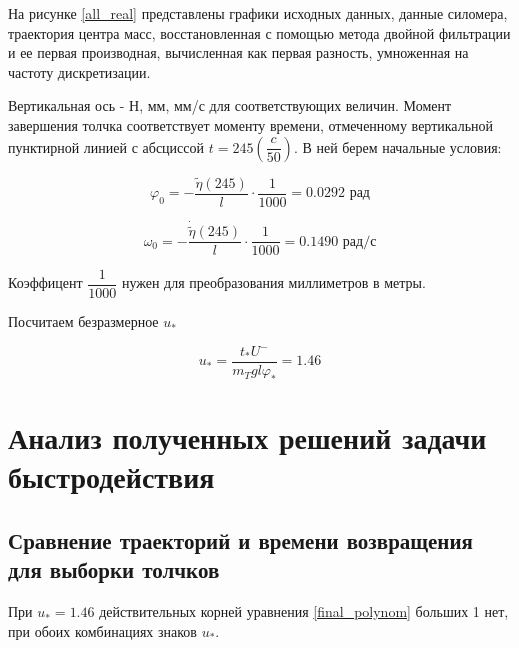 \documentclass[a4paper,12pt, openany]{book}
\theoremstyle{plain} %
\theoremstyle{definition} %
\theoremstyle{remark} %
\numberwithin{equation}{chapter}
\begin{document}
{На рисунке \ref{all_real} представлены графики исходных данных, данные силомера, траектория центра масс, восстановленная с помощью метода двойной фильтрации и ее первая производная, вычисленная как первая разность, умноженная на частоту дискретизации.

Вертикальная ось - Н, мм, мм/с для соответствующих величин. Момент завершения толчка соответствует
 моменту времени, отмеченному вертикальной пунктирной линией с абсциссой $t=245\left( \dfrac{c}{50} \right)$. В ней берем начальные условия:

$$\varphi_0=-\dfrac{\tilde{\eta}(245)}{l}\cdot\dfrac{1}{1000}=0.0292\text{ рад}$$

$$\omega_0=-\dfrac{\dot{\tilde{\eta}}(245)}{l}\cdot\dfrac{1}{1000}=0.1490\text{ рад/с}$$

Коэффицент $\dfrac{1}{1000}$ нужен для преобразования миллиметров в метры.

Посчитаем безразмерное $u_\ast$

\[
    u_\ast=\frac{t_\ast U^-}{m_Tgl\varphi_\ast }=1.46
\]


\newpage

\chapter{Анализ полученных решений задачи быстродействия}

\section{Сравнение траекторий и времени возвращения для выборки толчков}


При $u_\ast=1.46$ действительных корней уравнения \eqref{final_polynom} больших 1 нет,
при обоих комбинациях знаков $u_\ast$.

}
\end{document}

